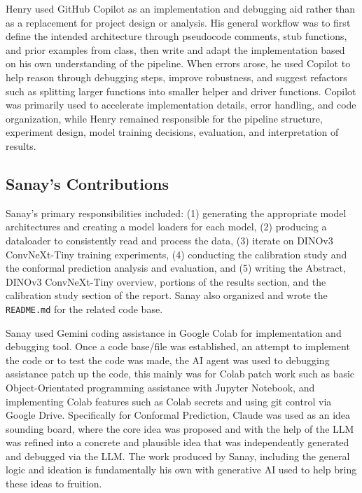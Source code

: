 \documentclass{article}
\begin{document}
Henry used GitHub Copilot as an implementation and debugging aid rather than as a replacement for project design or analysis. His general workflow was to first define the intended architecture through pseudocode comments, stub functions, and prior examples from class, then write and adapt the implementation based on his own understanding of the pipeline. When errors arose, he used Copilot to help reason through debugging steps, improve robustness, and suggest refactors such as splitting larger functions into smaller helper and driver functions. Copilot was primarily used to accelerate implementation details, error handling, and code organization, while Henry remained responsible for the pipeline structure, experiment design, model training decisions, evaluation, and interpretation of results.
\subsection{Sanay's Contributions}

Sanay's primary responsibilities included: (1) generating the appropriate model architectures and creating a model loaders for each model, (2) producing a dataloader to consistently read and process the data, (3) iterate on DINOv3 ConvNeXt-Tiny training experiments, (4) conducting the calibration study and the conformal prediction analysis and evaluation, and (5) writing the Abstract, DINOv3 ConvNeXt-Tiny overview, portions of the results section, and the calibration study section of the report. Sanay also organized and wrote the \verb|README.md| for the related code base. 

Sanay used Gemini coding assistance in Google Colab for implementation and debugging tool. Once a code base/file was established, an attempt to implement the code or to test the code was made, the AI agent was used to debugging assistance patch up the code, this mainly was for Colab patch work such as basic Object-Orientated programming assistance with Jupyter Notebook, and implementing Colab features such as Colab secrets and using git control via Google Drive. Specifically for Conformal Prediction, Claude was used as an idea sounding board, where the core idea was proposed and with the help of the LLM was refined into a concrete and plausible idea that was independently generated and debugged via the LLM. The work produced by Sanay, including the general logic and ideation is fundamentally his own with generative AI used to help bring these ideas to fruition.






\end{document}
